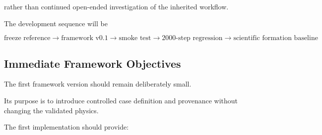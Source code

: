 \documentclass[11pt,a4paper]{article}
\begin{document}
rather than continued open-ended investigation of the inherited workflow.

The development sequence will be

\[
\boxed{
\text{freeze reference}
\rightarrow
\text{framework v0.1}
\rightarrow
\text{smoke test}
\rightarrow
\text{2000-step regression}
\rightarrow
\text{scientific formation baseline}
}
\]


\subsection{Immediate Framework Objectives}

The first framework version should remain deliberately small.

Its purpose is to introduce controlled case definition and provenance without
changing the validated physics.

The first implementation should provide:
\end{document}
